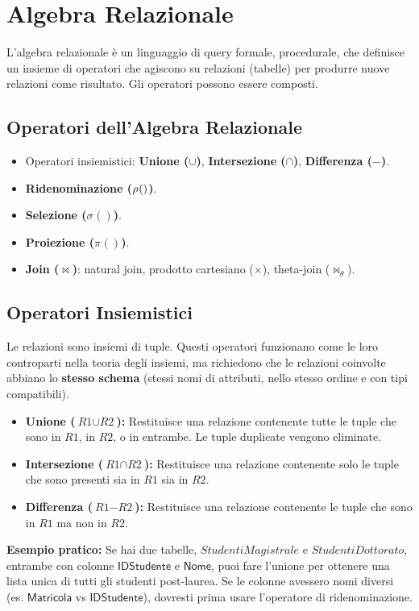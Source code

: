 \documentclass{article}
\newcommand{\Rel}[1]{\textit{#1}} %
\newcommand{\Attr}[1]{\textsf{#1}} %
\newcommand{\myunion}{\cup}
\newcommand{\myintersection}{\cap}
\newcommand{\mydifference}{-}
\newcommand{\myrename}[2]{\rho_{#1}(#2)}
\newcommand{\myselectop}[2]{\sigma_{#1}(#2)}
\newcommand{\myproject}[2]{\pi_{#1}(#2)}
\newcommand{\mycartesian}{\times}
\newcommand{\mynaturaljoin}{\bowtie} %
\begin{document}
	\section{Algebra Relazionale}
	
	L'algebra relazionale è un linguaggio di query formale, procedurale, che definisce un insieme di operatori che agiscono su relazioni (tabelle) per produrre nuove relazioni come risultato. Gli operatori possono essere composti.
	
	\subsection{Operatori dell'Algebra Relazionale}
	\begin{itemize}
		\item Operatori insiemistici: \textbf{Unione ($\myunion$)}, \textbf{Intersezione ($\myintersection$)}, \textbf{Differenza ($\mydifference$)}.
		\item \textbf{Ridenominazione ($\myrename{}$)}.
		\item \textbf{Selezione ($\myselectop{}{}$)}.
		\item \textbf{Proiezione ($\myproject{}{}$)}.
		\item \textbf{Join ($\mynaturaljoin$)}: natural join, prodotto cartesiano ($\mycartesian$), theta-join ($\bowtie_{\theta}$).
	\end{itemize}
	
	\subsection{Operatori Insiemistici}
	Le relazioni sono insiemi di tuple. Questi operatori funzionano come le loro controparti nella teoria degli insiemi, ma richiedono che le relazioni coinvolte abbiano lo \textbf{stesso schema} (stessi nomi di attributi, nello stesso ordine e con tipi compatibili).
	\begin{itemize}
		\item \textbf{Unione ($\Rel{R1} \myunion \Rel{R2}$):} Restituisce una relazione contenente tutte le tuple che sono in $\Rel{R1}$, in $\Rel{R2}$, o in entrambe. Le tuple duplicate vengono eliminate.
		\item \textbf{Intersezione ($\Rel{R1} \myintersection \Rel{R2}$):} Restituisce una relazione contenente solo le tuple che sono presenti sia in $\Rel{R1}$ sia in $\Rel{R2}$.
		\item \textbf{Differenza ($\Rel{R1} \mydifference \Rel{R2}$):} Restituisce una relazione contenente le tuple che sono in $\Rel{R1}$ ma non in $\Rel{R2}$.
	\end{itemize}
	\textbf{Esempio pratico:} Se hai due tabelle, $\Rel{StudentiMagistrale}$ e $\Rel{StudentiDottorato}$, entrambe con colonne $\Attr{IDStudente}$ e $\Attr{Nome}$, puoi fare l'unione per ottenere una lista unica di tutti gli studenti post-laurea. Se le colonne avessero nomi diversi (es. $\Attr{Matricola}$ vs $\Attr{IDStudente}$), dovresti prima usare l'operatore di ridenominazione.
	
\end{document}
